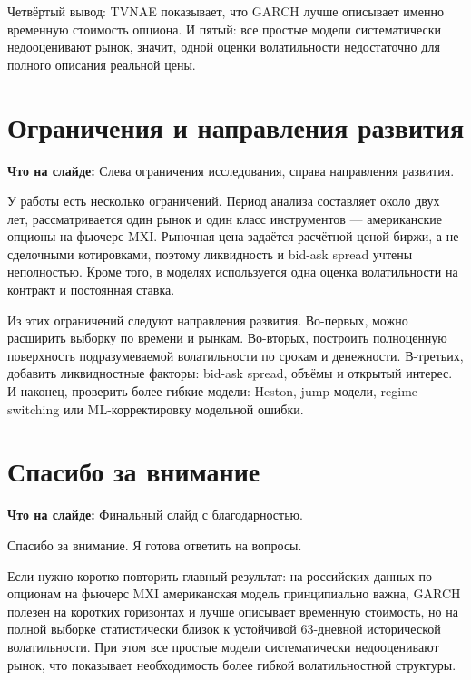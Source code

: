 \documentclass[11pt,a4paper]{article}
\newcommand{\whatsonslide}[1]{%
  \noindent\colorbox{softblue}{%
    \parbox{\dimexpr\linewidth-2\fboxsep\relax}{\textbf{Что на слайде:} #1}%
  }\par\vspace{0.2em}
}
\begin{document}
Четвёртый вывод: TVNAE показывает, что GARCH лучше описывает именно временную стоимость опциона. И пятый: все простые модели систематически недооценивают рынок, значит, одной оценки волатильности недостаточно для полного описания реальной цены.

\section{Ограничения и направления развития}

\whatsonslide{Слева ограничения исследования, справа направления развития.}

У работы есть несколько ограничений. Период анализа составляет около двух лет, рассматривается один рынок и один класс инструментов --- американские опционы на фьючерс MXI. Рыночная цена задаётся расчётной ценой биржи, а не сделочными котировками, поэтому ликвидность и bid-ask spread учтены неполностью. Кроме того, в моделях используется одна оценка волатильности на контракт и постоянная ставка.

Из этих ограничений следуют направления развития. Во-первых, можно расширить выборку по времени и рынкам. Во-вторых, построить полноценную поверхность подразумеваемой волатильности по срокам и денежности. В-третьих, добавить ликвидностные факторы: bid-ask spread, объёмы и открытый интерес. И наконец, проверить более гибкие модели: Heston, jump-модели, regime-switching или ML-корректировку модельной ошибки.

\section{Спасибо за внимание}

\whatsonslide{Финальный слайд с благодарностью.}

Спасибо за внимание. Я готова ответить на вопросы.

Если нужно коротко повторить главный результат: на российских данных по опционам на фьючерс MXI американская модель принципиально важна, GARCH полезен на коротких горизонтах и лучше описывает временную стоимость, но на полной выборке статистически близок к устойчивой 63-дневной исторической волатильности. При этом все простые модели систематически недооценивают рынок, что показывает необходимость более гибкой волатильностной структуры.
\end{document}
